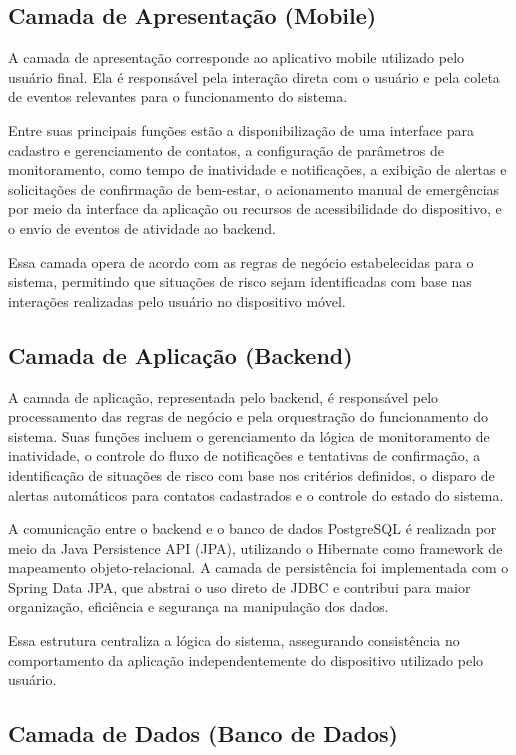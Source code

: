 \subsection{Camada de Apresentação (Mobile)}

A camada de apresentação corresponde ao aplicativo mobile utilizado pelo usuário final. Ela é responsável pela interação direta com o usuário e pela coleta de eventos relevantes para o funcionamento do sistema.

Entre suas principais funções estão a disponibilização de uma interface para cadastro e gerenciamento de contatos, a configuração de parâmetros de monitoramento, como tempo de inatividade e notificações, a exibição de alertas e solicitações de confirmação de bem-estar, o acionamento manual de emergências por meio da interface da aplicação ou recursos de acessibilidade do dispositivo, e o envio de eventos de atividade ao backend.

Essa camada opera de acordo com as regras de negócio estabelecidas para o sistema, permitindo que situações de risco sejam identificadas com base nas interações realizadas pelo usuário no dispositivo móvel.

\subsection{Camada de Aplicação (Backend)}

A camada de aplicação, representada pelo backend, é responsável pelo processamento das regras de negócio e pela orquestração do funcionamento do sistema. Suas funções incluem o gerenciamento da lógica de monitoramento de inatividade, o controle do fluxo de notificações e tentativas de confirmação, a identificação de situações de risco com base nos critérios definidos, o disparo de alertas automáticos para contatos cadastrados e o controle do estado do sistema.

A comunicação entre o backend e o banco de dados PostgreSQL é realizada por meio da Java Persistence API (JPA), utilizando o Hibernate como framework de mapeamento objeto-relacional. A camada de persistência foi implementada com o Spring Data JPA, que abstrai o uso direto de JDBC e contribui para maior organização, eficiência e segurança na manipulação dos dados.

Essa estrutura centraliza a lógica do sistema, assegurando consistência no comportamento da aplicação independentemente do dispositivo utilizado pelo usuário.

\subsection{Camada de Dados (Banco de Dados)}

